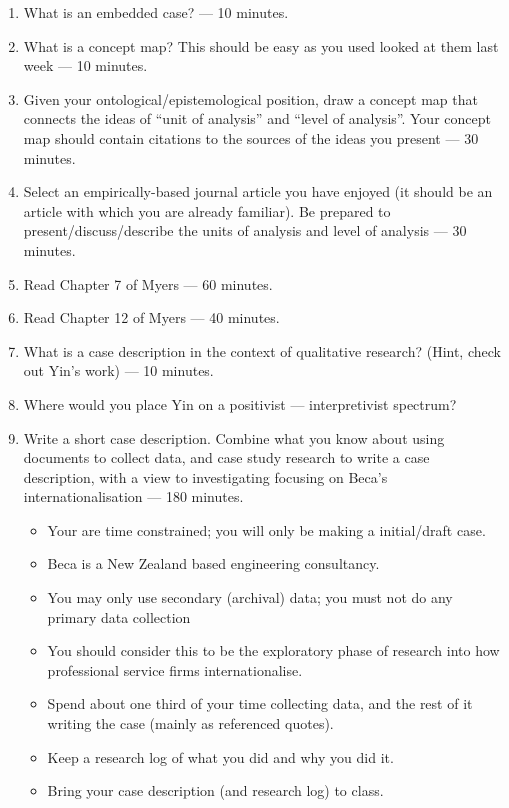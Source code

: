 \documentclass[]{book}
\providecommand{\tightlist}{%
  \setlength{\itemsep}{0pt}\setlength{\parskip}{0pt}}
\theoremstyle{definition}
\theoremstyle{definition}
\theoremstyle{definition}
\theoremstyle{remark}
\begin{document}
\begin{enumerate}
\def\labelenumi{\arabic{enumi}.}
\item
  What is an embedded case? --- 10 minutes.
\item
  What is a concept map? This should be easy as you used looked at them
  last week --- 10 minutes.
\item
  Given your ontological/epistemological position, draw a concept map
  that connects the ideas of ``unit of analysis'' and ``level of
  analysis''. Your concept map should contain citations to the sources
  of the ideas you present --- 30 minutes.
\item
  Select an empirically-based journal article you have enjoyed (it
  should be an article with which you are already familiar). Be prepared
  to present/discuss/describe the units of analysis and level of
  analysis --- 30 minutes.
\item
  Read Chapter 7 of Myers \autocite*[
  p.~73--91]{myers_2013_qualitativeresearchbusiness} --- 60 minutes.
\item
  Read Chapter 12 of Myers \autocite*[
  p.~151--162]{myers_2013_qualitativeresearchbusiness} --- 40 minutes.
\item
  What is a case description in the context of qualitative research?
  (Hint, check out Yin's work) --- 10 minutes.
\item
  Where would you place Yin on a positivist --- interpretivist spectrum?
\item
  Write a short case description. Combine what you know about using
  documents to collect data, and case study research to write a case
  description, with a view to investigating focusing on Beca's
  internationalisation --- 180 minutes.

  \begin{itemize}
  \tightlist
  \item
    Your are time constrained; you will only be making a initial/draft
    case.
  \item
    Beca is a New Zealand based engineering consultancy.
  \item
    You may only use secondary (archival) data; you must not do any
    primary data collection
  \item
    You should consider this to be the exploratory phase of research
    into how professional service firms internationalise.
  \item
    Spend about one third of your time collecting data, and the rest of
    it writing the case (mainly as referenced quotes).
  \item
    Keep a research log of what you did and why you did it.
  \item
    Bring your case description (and research log) to class.
  \end{itemize}
\end{enumerate}
\end{document}

